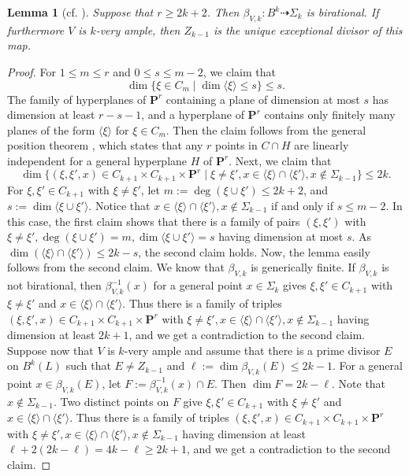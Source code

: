 \documentclass[12pt]{amsart}
\newcounter{thmcounter}
\numberwithin{equation}{section}
\numberwithin{thmcounter}{section}
\newtheorem{lemma}[thmcounter]{Lemma}
\theoremstyle{definition}
\theoremstyle{claim}
\newcommand{\nP}{\mathbf{P}}
\begin{document}
\begin{lemma}[{cf. \cite[Lemma 4.4]{kummersinn}}]\label{lem:beta=bir}
Suppose that $r \geq 2k+2$. Then $\beta_{V,k} \colon B^k \dashrightarrow \Sigma_k$ is birational. If furthermore $V$ is $k$-very ample, then $Z_{k-1}$ is the unique exceptional divisor of this map.
\end{lemma}

\begin{proof}
	For $1 \leq m \leq r$ and $0 \leq s \leq m-2$, we claim that
	$$
	\dim \{ \xi \in C_m \mid \dim \langle \xi \rangle \leq s \} \leq s.
	$$
	The family of hyperplanes of $\nP^r$ containing a plane of dimension at most $s$ has dimension at least $r-s-1$, and a hyperplane of $\nP^r$ contains only finitely many planes of the form $\langle \xi \rangle$ for $\xi \in C_m$. Then the claim follows from the general position theorem \cite[p.109]{ACGH}, which states that any $r$ points in $C \cap H$ are linearly independent for a general hyperplane $H$ of $\nP^r$. Next, we claim that
	$$
	\dim \{ (\xi, \xi', x) \in C_{k+1} \times C_{k+1} \times \nP^r \mid \xi \neq \xi', x \in \langle \xi \rangle \cap \langle \xi' \rangle, x \not\in \Sigma_{k-1} \} \leq 2k. 
	$$
	For $\xi, \xi' \in C_{k+1}$ with $\xi \neq \xi'$, let $m:=\deg (\xi \cup \xi') \leq 2k+2$, and $s:=\dim \langle \xi \cup \xi' \rangle$. Notice that $x \in \langle \xi \rangle \cap \langle \xi' \rangle, x \not\in \Sigma_{k-1}$ if and only if $s \leq m-2$. In this case, the first claim shows that there is a family of pairs $(\xi, \xi')$ with  $\xi \neq \xi', \deg (\xi \cup \xi')=m, \dim \langle \xi \cup \xi' \rangle = s$ having dimension at most $s$. As $\dim (\langle \xi \rangle \cap \langle \xi' \rangle) \leq 2k-s$, the second claim holds. Now, the lemma easily follows from the second claim. We know that $\beta_{V,k}$ is generically finite. If $\beta_{V,k}$ is not birational, then $\beta_{V,k}^{-1}(x)$ for a general point $x \in \Sigma_k$ gives  $\xi, \xi' \in C_{k+1}$ with $\xi \neq \xi'$ and $x \in \langle \xi \rangle \cap \langle \xi' \rangle$. Thus there is a family of triples $(\xi, \xi', x) \in C_{k+1} \times C_{k+1} \times \nP^r$ with $\xi \neq \xi', x \in \langle \xi \rangle \cap \langle \xi' \rangle, x \not\in \Sigma_{k-1}$ having dimension at least $2k+1$, and we get a contradiction to the second claim. 
	Suppose now that $V$ is $k$-very ample and assume that there is a prime divisor $E$ on $B^k(L)$ such that $E \neq Z_{k-1}$ and $\ell:=\dim \beta_{V,k}(E) \leq 2k-1$. For a general point $x \in \beta_{V,k}(E)$, let $F:=\beta_{V,k}^{-1}(x) \cap E$. Then $\dim F = 2k-\ell$. Note that $x \not\in \Sigma_{k-1}$. Two distinct points on $F$ give $\xi, \xi' \in C_{k+1}$ with $\xi \neq \xi'$ and $x \in \langle \xi \rangle \cap \langle \xi' \rangle$. Thus there is a family of triples $(\xi, \xi', x) \in C_{k+1} \times C_{k+1} \times \nP^r$ with $\xi \neq \xi', x \in \langle \xi \rangle \cap \langle \xi' \rangle, x \not\in \Sigma_{k-1}$ having dimension at least $\ell + 2(2k-\ell) = 4k-\ell \geq 2k+1$, and we get a contradiction to the second claim. 
\end{proof}
\end{document}
